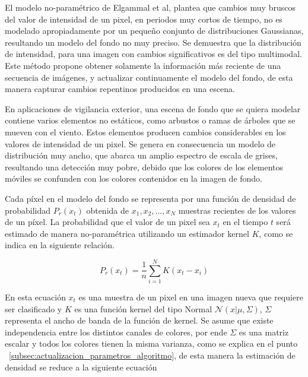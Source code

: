 El modelo no-paramétrico de Elgammal et al\cite{elgammal_nonparametricmodel_2000}, plantea que cambios muy bruscos del valor de intensidad de un pixel, en periodos muy cortos de tiempo, no es modelado apropiadamente por un pequeño conjunto de distribuciones Gaussianas, resultando un modelo del fondo no muy preciso. Se demuestra que la distribución de intensidad, para una imagen con cambios significativos es del tipo multimodal. Este método propone obtener solamente la información más reciente de una secuencia de imágenes, y actualizar continuamente el modelo del fondo, de esta manera capturar cambios repentinos producidos en una escena.

En aplicaciones de vigilancia exterior, una escena de fondo que se quiera modelar contiene varios elementos no estáticos, como arbustos o ramas de árboles que se mueven con el viento. Estos elementos producen cambios considerables en los valores de intensidad de un pixel. Se genera en consecuencia un modelo de distribución muy ancho, que abarca un amplio espectro de escala de grises, resultando una detección muy pobre, debido que los colores de los elementos móviles se confunden con los colores contenidos en la imagen de fondo. 

Cada píxel en el modelo del fondo se representa por una función de densidad de probabilidad $P_r(x_t)$ obtenida de $x_1, x_2, ..., x_N$ muestras recientes  de los valores de un píxel. La probabilidad que el valor de un pixel sea $x_t$ en el tiempo $t$ será estimado de manera no-paramétrica utilizando un estimador kernel $K$, como se indica en la siguiente relación. 

\begin{equation} \label{eq:nonparametric}
P_r{(x_t)} = \frac{1}{n} \sum_{i=1}^{N} K(x_t-x_i)
\end{equation}

En esta ecuación $x_t$ es una muestra de un pixel en una imagen nueva que requiere ser clasificado y $K$ es una función kernel del tipo Normal $\mathcal{N}(x | \mu , \Sigma)$, $\Sigma$ representa el ancho de banda de la función de kernel. Se asume que existe independencia entre los distintos canales de colores, por ende $\Sigma$ es una matriz escalar y todos los colores tienen la misma varianza, como se explica en el punto  ~\ref{subsec:actualizacion_parametros_algoritmo}, de esta manera la estimación de densidad se reduce a la siguiente ecuación


